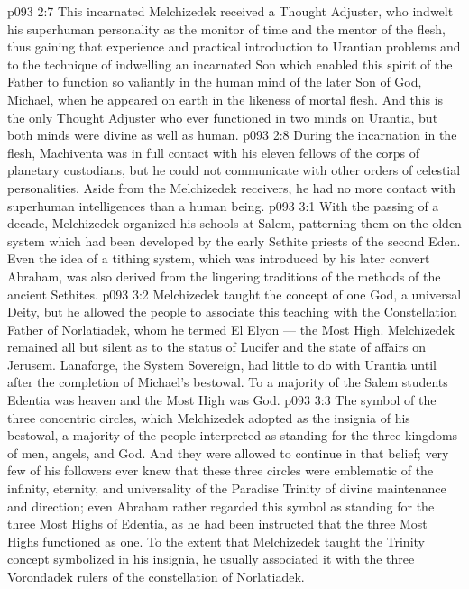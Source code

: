 \vs p093 2:7 \pc This incarnated Melchizedek received a Thought Adjuster, who indwelt his superhuman personality as the monitor of time and the mentor of the flesh, thus gaining that experience and practical introduction to Urantian problems and to the technique of indwelling an incarnated Son which enabled this spirit of the Father to function so valiantly in the human mind of the later Son of God, Michael, when he appeared on earth in the likeness of mortal flesh. And this is the only Thought Adjuster who ever functioned in two minds on Urantia, but both minds were divine as well as human.
\vs p093 2:8 During the incarnation in the flesh, Machiventa was in full contact with his eleven fellows of the corps of planetary custodians, but he could not communicate with other orders of celestial personalities. Aside from the Melchizedek receivers, he had no more contact with superhuman intelligences than a human being.
\vs p093 3:1 With the passing of a decade, Melchizedek organized his schools at Salem, patterning them on the olden system which had been developed by the early Sethite priests of the second Eden. Even the idea of a tithing system, which was introduced by his later convert Abraham, was also derived from the lingering traditions of the methods of the ancient Sethites.
\vs p093 3:2 Melchizedek taught the concept of one God, a universal Deity, but he allowed the people to associate this teaching with the Constellation Father of Norlatiadek, whom he termed El Elyon --- the Most High. Melchizedek remained all but silent as to the status of Lucifer and the state of affairs on Jerusem. Lanaforge, the System Sovereign, had little to do with Urantia until after the completion of Michael’s bestowal. To a majority of the Salem students Edentia was heaven and the Most High was God.
\vs p093 3:3 The symbol of the three concentric circles, which Melchizedek adopted as the insignia of his bestowal, a majority of the people interpreted as standing for the three kingdoms of men, angels, and God. And they were allowed to continue in that belief; very few of his followers ever knew that these three circles were emblematic of the infinity, eternity, and universality of the Paradise Trinity of divine maintenance and direction; even Abraham rather regarded this symbol as standing for the three Most Highs of Edentia, as he had been instructed that the three Most Highs functioned as one. To the extent that Melchizedek taught the Trinity concept symbolized in his insignia, he usually associated it with the three Vorondadek rulers of the constellation of Norlatiadek.
